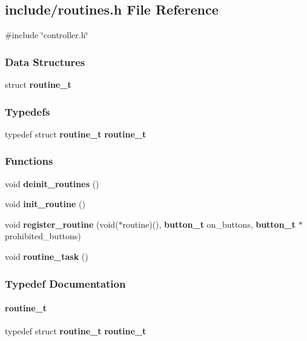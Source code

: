 \subsection{include/routines.h File Reference}
\label{routines_8h}
{\ttfamily \#include \char`\"{}controller.\+h\char`\"{}}\newline
\subsubsection*{Data Structures}
\begin{DoxyCompactItemize}
\item 
struct \textbf{ routine\+\_\+t}
\end{DoxyCompactItemize}
\subsubsection*{Typedefs}
\begin{DoxyCompactItemize}
\item 
typedef struct \textbf{ routine\+\_\+t} \textbf{ routine\+\_\+t}
\end{DoxyCompactItemize}
\subsubsection*{Functions}
\begin{DoxyCompactItemize}
\item 
void \textbf{ deinit\+\_\+routines} ()
\item 
void \textbf{ init\+\_\+routine} ()
\item 
void \textbf{ register\+\_\+routine} (void($\ast$routine)(), \textbf{ button\+\_\+t} on\+\_\+buttons, \textbf{ button\+\_\+t} $\ast$prohibited\+\_\+buttons)
\item 
void \textbf{ routine\+\_\+task} ()
\end{DoxyCompactItemize}


\subsubsection{Typedef Documentation}
\mbox{\label{routines_8h_a9105ef626cef6848419da1a89fe90e07}} 
\paragraph{routine\+\_\+t}
{\footnotesize\ttfamily typedef struct \textbf{ routine\+\_\+t} \textbf{ routine\+\_\+t}}



